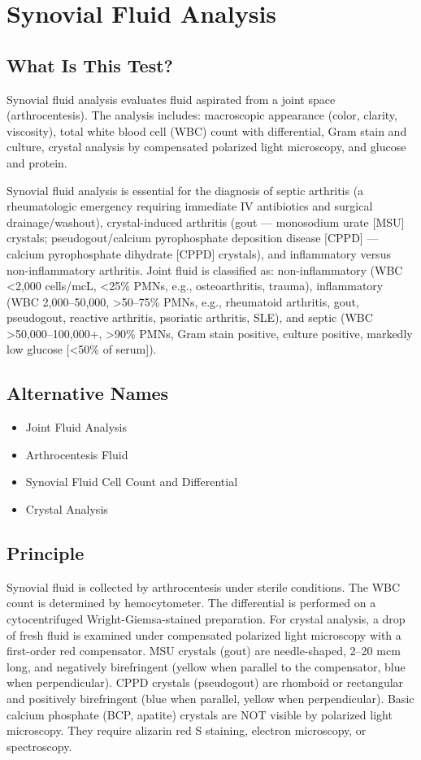 \chapter{Synovial Fluid Analysis}
\section*{What Is This Test?}
Synovial fluid analysis evaluates fluid aspirated from a joint space (arthrocentesis). The analysis includes: macroscopic appearance (color, clarity, viscosity), total white blood cell (WBC) count with differential, Gram stain and culture, crystal analysis by compensated polarized light microscopy, and glucose and protein.

Synovial fluid analysis is essential for the diagnosis of septic arthritis (a rheumatologic emergency requiring immediate IV antibiotics and surgical drainage/washout), crystal-induced arthritis (gout --- monosodium urate [MSU] crystals; pseudogout/calcium pyrophosphate deposition disease [CPPD] --- calcium pyrophosphate dihydrate [CPPD] crystals), and inflammatory versus non-inflammatory arthritis. Joint fluid is classified as: non-inflammatory (WBC <2,000 cells/mcL, <25\% PMNs, e.g., osteoarthritis, trauma), inflammatory (WBC 2,000--50,000, >50--75\% PMNs, e.g., rheumatoid arthritis, gout, pseudogout, reactive arthritis, psoriatic arthritis, SLE), and septic (WBC >50,000--100,000+, >90\% PMNs, Gram stain positive, culture positive, markedly low glucose [<50\% of serum]).
\section*{Alternative Names}
\begin{itemize}
  \item Joint Fluid Analysis
  \item Arthrocentesis Fluid
  \item Synovial Fluid Cell Count and Differential
  \item Crystal Analysis
\end{itemize}
\section*{Principle}
Synovial fluid is collected by arthrocentesis under sterile conditions. The WBC count is determined by hemocytometer. The differential is performed on a cytocentrifuged Wright-Giemsa-stained preparation. For crystal analysis, a drop of fresh fluid is examined under compensated polarized light microscopy with a first-order red compensator. MSU crystals (gout) are needle-shaped, 2--20 mcm long, and negatively birefringent (yellow when parallel to the compensator, blue when perpendicular). CPPD crystals (pseudogout) are rhomboid or rectangular and positively birefringent (blue when parallel, yellow when perpendicular). Basic calcium phosphate (BCP, apatite) crystals are NOT visible by polarized light microscopy. They require alizarin red S staining, electron microscopy, or spectroscopy.
